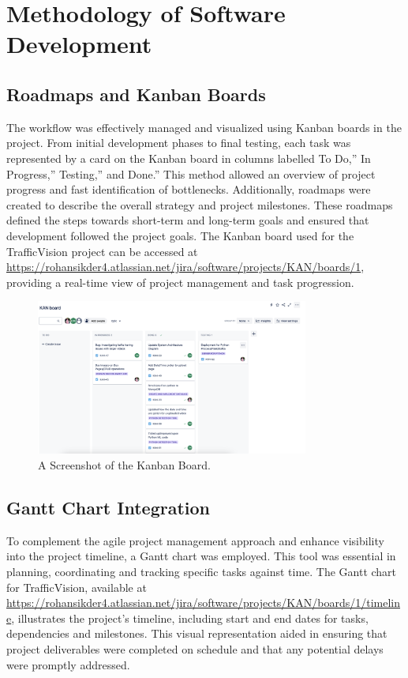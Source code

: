 \chapter{Methodology of Software Development}

\section{Roadmaps and Kanban Boards}
The workflow was effectively managed and visualized using Kanban boards in the project. From initial development phases to final testing, each task was represented by a card on the Kanban board in columns labelled To Do,'' In Progress,'' Testing,'' and Done.'' This method allowed an overview of project progress and fast identification of bottlenecks. Additionally, roadmaps were created to describe the overall strategy and project milestones. These roadmaps defined the steps towards short-term and long-term goals and ensured that development followed the project goals. The Kanban board used for the TrafficVision project can be accessed at \url{https://rohansikder4.atlassian.net/jira/software/projects/KAN/boards/1}, providing a real-time view of project management and task progression.

\begin{figure}[H]
    \centering
    \includegraphics[width=0.8\textwidth]{images/kanban.png}
    \caption{A Screenshot of the Kanban Board.}
    \label{fig:Kanban Board}
\end{figure}


\section{Gantt Chart Integration}
To complement the agile project management approach and enhance visibility into the project timeline, a Gantt chart was employed. This tool was essential in planning, coordinating and tracking specific tasks against time. The Gantt chart for TrafficVision, available at \url{https://rohansikder4.atlassian.net/jira/software/projects/KAN/boards/1/timeline}, illustrates the project’s timeline, including start and end dates for tasks, dependencies and milestones. This visual representation aided in ensuring that project deliverables were completed on schedule and that any potential delays were promptly addressed.


